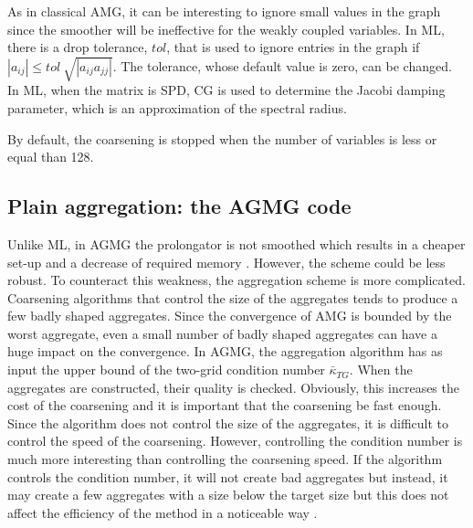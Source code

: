 As in classical AMG, it can be interesting to ignore small values in
the graph since the smoother will be ineffective for the weakly coupled
variables. In ML, there is a drop tolerance, $tol$, that is used to ignore
entries in the graph if $|a_{ij}| \leq tol\ \sqrt{|a_{ij} a_{jj}|}$. The
tolerance, whose default value is zero, can be changed.  In ML, when the 
matrix is SPD, CG is used to determine the Jacobi damping parameter, which 
is an approximation of the spectral radius.

By default, the coarsening is stopped when the number of variables is less 
or equal than 128.

\subsection{Plain aggregation: the AGMG code}
Unlike ML, in AGMG the prolongator is not smoothed which results in a
cheaper set-up and a decrease of required memory \cite{agmg2}. However, 
the scheme could be less robust. To counteract this weakness, 
the aggregation scheme is more complicated. Coarsening algorithms that control
the size of the aggregates tends to produce a few badly shaped aggregates.
Since the convergence of AMG is bounded by the worst aggregate, even a small 
number of badly shaped aggregates can have a huge impact on the convergence. 
In AGMG, the aggregation algorithm has as input the upper bound of the 
two-grid condition number $\bar{\kappa}_{TG}$. When the aggregates are constructed,
their quality is checked. Obviously, this increases the cost of the coarsening
and it is important that the coarsening be fast enough. Since the algorithm 
does not control the size of the aggregates, it is difficult to control the 
speed of the coarsening. However, controlling the condition number is much 
more interesting than controlling the coarsening speed. If the algorithm 
controls the condition number, it will not create bad aggregates but instead, it 
may create a few aggregates with a size below the target size but this 
does not affect the efficiency of the method in a noticeable way \cite{agmg2}. 

